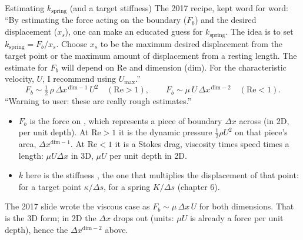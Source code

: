 \documentclass[aspectratio=169,11pt]{beamer}
\begin{document}
\begin{frame}{Estimating $k_{\mathrm{spring}}$ (and a target stiffness)}
\label{fr:kspring}
\small The 2017 recipe, kept word for word: ``By estimating the force acting on the boundary ($F_b$) and the desired displacement ($x_s$), one can make an educated guess for $k_{\mathrm{spring}}$. The idea is to set $k_{\mathrm{spring}} = F_b/x_s$. Choose $x_s$ to be the maximum desired displacement from the target point or the maximum amount of displacement from a resting length. The estimate for $F_b$ will depend on $\mathrm{Re}$ and dimension (dim). For the characteristic velocity, $U$, I recommend using $U_{\max}$.''
\[
  F_b \sim \tfrac12\,\rho\,\Delta x^{\,\mathrm{dim}-1}\,U^2 \quad (\mathrm{Re} > 1), \qquad
  F_b \sim \mu\,U\,\Delta x^{\,\mathrm{dim}-2} \quad (\mathrm{Re} < 1).
\]
``Warning to user: these are really rough estimates.''
\begin{itemize}
  \item[] \hspace{-4mm}$F_b$ is the force on , which represents a piece of boundary $\Delta x$ across (in 2D, per unit depth). At $\mathrm{Re} > 1$ it is the dynamic pressure $\frac12\rho U^2$ on that piece's area, $\Delta x^{\mathrm{dim}-1}$. At $\mathrm{Re} < 1$ it is a Stokes drag, viscosity times speed times a length: $\mu U \Delta x$ in 3D, $\mu U$ per unit depth in 2D.
  \item[] \hspace{-4mm}$k$ here is the stiffness , the one that multiplies the displacement of that point: for a target point $\kappa/\Delta s$, for a spring $K/\Delta s$ (chapter 6).
\end{itemize}
\begin{punchbox}
\footnotesize {} The 2017 slide wrote the viscous case as $F_b \sim \mu\,\Delta x\,U$ for both dimensions. That is the 3D form; in 2D the $\Delta x$ drops out (units: $\mu U$ is already a force per unit depth), hence the $\Delta x^{\mathrm{dim}-2}$ above.
\end{punchbox}
\end{frame}
\end{document}
